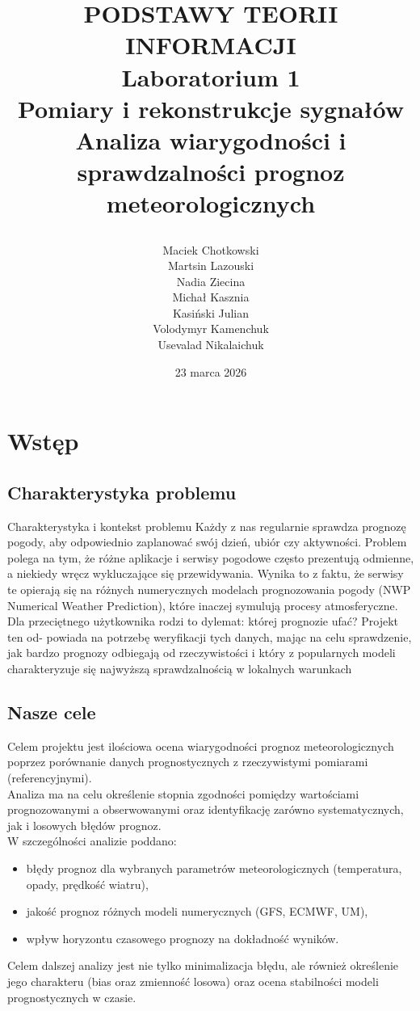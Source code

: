 \documentclass[a4paper,12pt]{article}
\title{
    
    \vspace{1.5cm}
    \textbf{PODSTAWY TEORII INFORMACJI}\\
    \vspace{1.5cm}
    Laboratorium 1\\
    Pomiary i rekonstrukcje sygnałów\\
    \vspace{1.5cm}
    \huge \textbf{Analiza wiarygodności i sprawdzalności prognoz meteorologicznych}\\
    \vspace{1cm}
}
\author{
    Maciek Chotkowski \\ Martsin Lazouski \\ Nadia Ziecina \\
    Michał Kasznia \\ Kasiński Julian  \\ Volodymyr Kamenchuk \\ Usevalad Nikalaichuk 
}
\date{23 marca 2026}
\begin{document}
\maketitle
\newpage

\tableofcontents
\newpage

\section{Wstęp}

\subsection{Charakterystyka problemu}
Charakterystyka i kontekst problemu Każdy z nas regularnie sprawdza prognozę
pogody, aby odpowiednio zaplanować swój dzień, ubiór czy aktywności. Problem
polega na tym, że różne aplikacje i serwisy pogodowe często prezentują odmienne,
a niekiedy wręcz wykluczające się przewidywania. Wynika to z faktu, że serwisy
te opierają się na różnych numerycznych modelach prognozowania pogody (NWP
Numerical Weather Prediction), które inaczej symulują procesy atmosferyczne. Dla
przeciętnego użytkownika rodzi to dylemat: której prognozie ufać? Projekt ten od-
powiada na potrzebę weryfikacji tych danych, mając na celu sprawdzenie, jak bardzo
prognozy odbiegają od rzeczywistości i który z popularnych modeli charakteryzuje
się najwyższą sprawdzalnością w lokalnych warunkach

\subsection{Nasze cele}
Celem projektu jest ilościowa ocena wiarygodności prognoz meteorologicznych 
poprzez porównanie danych prognostycznych z rzeczywistymi pomiarami 
(referencyjnymi).
\\

\noindent
Analiza ma na celu określenie stopnia zgodności pomiędzy wartościami 
prognozowanymi a obserwowanymi oraz identyfikację zarówno systematycznych, 
jak i losowych błędów prognoz.
\\

\noindent
W szczególności analizie poddano:
\begin{itemize}
    \item błędy prognoz dla wybranych parametrów meteorologicznych 
    (temperatura, opady, prędkość wiatru),
    \item jakość prognoz różnych modeli numerycznych (GFS, ECMWF, UM),
    \item wpływ horyzontu czasowego prognozy na dokładność wyników.
\end{itemize}
Celem dalszej analizy jest nie tylko minimalizacja błędu, ale również 
określenie jego charakteru (bias oraz zmienność losowa) oraz ocena 
stabilności modeli prognostycznych w czasie.
\newpage
\end{document}
